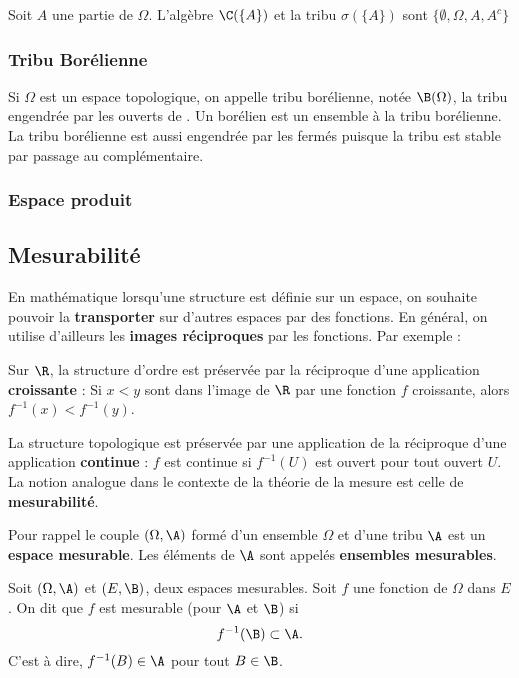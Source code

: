 \bex
Soit $A$ une partie de $\Omega$. L'algèbre $\C(\{A\})$ et la tribu $\sigma(\{A\})$ sont $\{\emptyset, \Omega, A,A^c\}$
\eex

\subsubsection{Tribu Borélienne}
Si $\Omega$ est un espace topologique, on appelle tribu borélienne, notée $\B(\Omega)$, la tribu engendrée par les ouverts de \Omega. Un borélien est un ensemble à la tribu borélienne.
\ed
\bn
La tribu borélienne est aussi engendrée par les fermés puisque la tribu est stable par passage au complémentaire.
\en

\subsubsection{Espace produit}

\subsection{Mesurabilité}
En mathématique lorsqu'une structure est définie sur un espace, on souhaite pouvoir la \textbf{transporter} sur d'autres espaces par des fonctions. En général, on utilise d'ailleurs les \textbf{images réciproques} par les fonctions. 
\bex Par exemple :
\ben
    \item Sur $\R$, la structure d'ordre est préservée par la réciproque d'une application \textbf{croissante} : Si $x < y$ sont dans l'image de $\R$ par une fonction $f$ croissante, alors $f^{-1}(x) < f^{-1}(y)$.
    \item La structure topologique est préservée par une application de la réciproque d'une application \textbf{continue} : $f$ est continue si $f^{-1}(U)$ est ouvert pour tout ouvert $U$.
\een
\eex
La notion analogue dans le contexte de la théorie de la mesure est celle de \textbf{mesurabilité}.

\bigskip

 Pour rappel le couple $(\Omega, \A)$ formé d'un ensemble $\Omega$ et d'une tribu $\A$ est un \textbf{espace mesurable}. Les éléments de $\A$ sont appelés \textbf{ensembles mesurables}.
\ben
    \item[(i)] Soit $(\Omega, \A)$ et $(E, \B)$, deux espaces mesurables. Soit $f$ une fonction de $\Omega$ dans $E$. On dit que $f$ est mesurable (pour $\A$ et $\B$) si $$f^{-1}(\B) \subset \A.$$ C'est à dire, $f^{-1}(B) \in \A$ pour tout $B \in \B$.
\een
\ed

